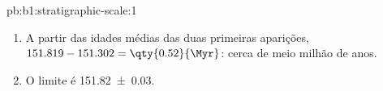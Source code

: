 \begin{solution}{pb:b1:stratigraphic-scale:1}
\begin{enumerate}
        sem mudança de fácies perto do nível, e a taxa dá \num{2.5} mil anos por \qty{10}{cm}. A
        resolve o tempo melhor, mas coloca o nível no arenito da linha de costa, \qty{8.4}{m}
        abaixo de uma mudança de fácies; C é condensada, \num{5} mil anos por \qty{10}{cm}. C é a
        pior para a resolução, A para as fácies.
  \item A partir das idades médias das duas primeiras aparições, $151.819 - 151.302 =
        \qty{0.52}{\Myr}$: cerca de meio milhão de anos.
  \item O limite é \qty[uncertainty-mode=separate]{151.82(3)}{\Ma}.
\end{enumerate}
\end{solution}
